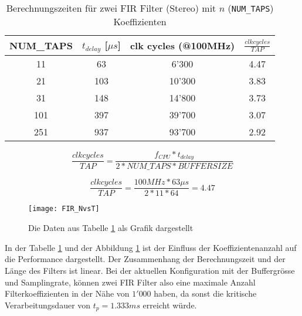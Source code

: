 \begin{table}[H]
	\centering
	\begin{tabular}{|c|c|c|c|}
		\hline
		\textbf{NUM\_TAPS} & \textbf{$t_{delay}$ {[}$\mu s${]}} & \textbf{clk cycles (@100MHz)} & \textbf{$\frac{\si{clk cycles}}{\si{TAP}}$} \\ \hline
		11                 & 63                      & 6'300                          & 4.47                       \\ \hline
		21                 & 103                     & 10'300                         & 3.83                       \\ \hline
		31                 & 148                     & 14'800                         & 3.73                       \\ \hline
		101                & 397                     & 39'700                         & 3.07                       \\ \hline
		251                & 937                     & 93'700                         & 2.92                       \\ \hline
	\end{tabular}
	\caption{Berechnungszeiten für zwei FIR Filter (Stereo) mit $n$ (\texttt{NUM\_TAPS}) Koeffizienten}
	\label{tab:FIR_performance}
\end{table}

\begin{equation}
\frac{clkcycles}{TAP}=\frac{f_{CPU}*t_{delay}}{2*NUM\_TAPS*BUFFERSIZE}
\end{equation}

\begin{equation}
\frac{clkcycles}{TAP}=\frac{100\si{MHz}*63\mu\si{s}}{2*11*64}=4.47
\end{equation}

\begin{figure}[H]
	\centering
	\texttt{[image: FIR\_NvsT]}
	\caption{Die Daten aus Tabelle \ref{tab:FIR_performance} als Grafik dargestellt}
	\label{pic:FIR_NvsT}
\end{figure}

In der Tabelle \ref{tab:FIR_performance} und der Abbildung \ref{pic:FIR_NvsT} ist der Einfluss der Koeffizientenanzahl auf die Performance dargestellt.
Der Zusammenhang der Berechnungszeit und der Länge des Filters ist linear.
Bei der aktuellen Konfiguration mit der Buffergrösse und Samplingrate, können zwei FIR Filter also eine maximale Anzahl Filterkoeffizienten in der Nähe von $1'000$ haben, da sonst die kritische Verarbeitungsdauer von $t_{p}=1.333\si{ms}$ erreicht würde.

